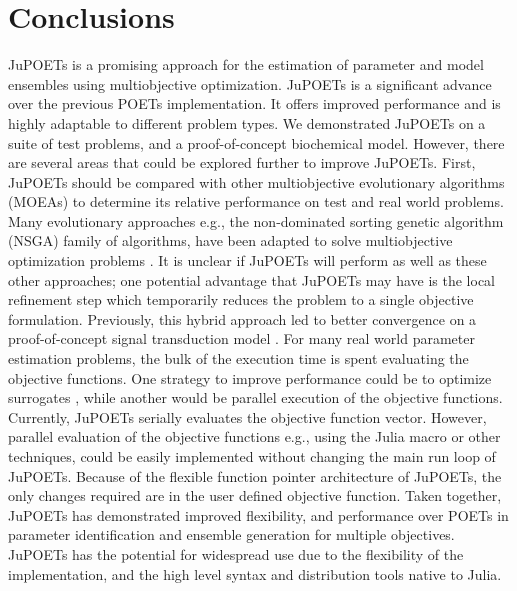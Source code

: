 \documentclass{bmcart}
\begin{document}
\section*{Conclusions}
JuPOETs is a promising approach for the estimation of parameter and model ensembles using multiobjective optimization.
JuPOETs is a significant advance over the previous POETs implementation.
It offers improved performance and is highly adaptable to different problem types.
We demonstrated JuPOETs on a suite of test problems, and a proof-of-concept biochemical model.
However, there are several areas that could be explored further to improve JuPOETs.
First, JuPOETs should be compared with other multiobjective evolutionary algorithms (MOEAs) to determine its relative performance on test and real world problems.
Many evolutionary approaches e.g., the non-dominated sorting genetic algorithm (NSGA) family of algorithms, have been adapted to solve multiobjective optimization problems \cite{DEB2002,HUBAND2006}. It is unclear if JuPOETs will perform as well as these other approaches;
one potential advantage that JuPOETs may have is the local refinement step which temporarily reduces the problem to a single objective formulation.
Previously, this hybrid approach led to better convergence on a proof-of-concept signal transduction model \cite{Song:2010aa}.
For many real world parameter estimation problems, the bulk of the execution time is spent evaluating the objective functions.
One strategy to improve performance could be to optimize surrogates \cite{SURROGATES}, while another would be parallel execution of the objective functions.
Currently, JuPOETs serially evaluates the objective function vector.
However, parallel evaluation of the objective functions e.g., using the \texttt{\@parallel} Julia macro or other techniques,
could be easily implemented without changing the main run loop of JuPOETs.
Because of the flexible function pointer architecture of JuPOETs, the only changes required are in the user defined objective function.
Taken together, JuPOETs has demonstrated improved flexibility, and performance over POETs in parameter identification and ensemble generation for multiple objectives.
JuPOETs has the potential for widespread use due to the flexibility of the implementation, and the high level syntax and distribution tools native to Julia.

\end{document}
